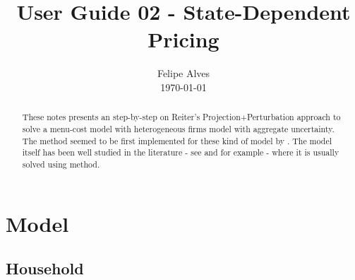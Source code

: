 \documentclass[a4paper,10pt]{article}  %
\title{User Guide 02 - State-Dependent Pricing \vspace{-1.25em}} %
\author{
        \normalfont\large Felipe Alves \\[-2.5pt]       \normalsize
        \today
}
\date{ \vspace{-3em} }
\begin{document}
\maketitle
\begin{abstract}
   These notes presents an step-by-step on Reiter’s Projection+Perturbation approach to solve a menu-cost model with heterogeneous
   firms model with aggregate uncertainty. The method seemed to be first implemented for these kind of model by \citet{reiterstudent}.
   The model itself has been well studied in the literature - see \citet{midrigan} and \citet{Vavra} for example - where it
   is usually solved using \citet{krusell_smith} method.
\end{abstract}
   


\section{Model} %
\label{sec:model}

\subsection{Household} %
\label{sub:household}
\end{document}
